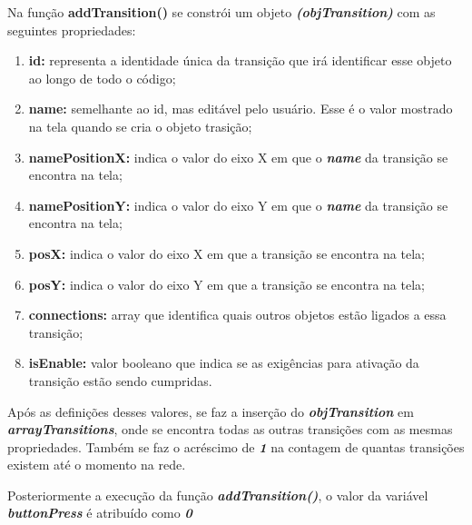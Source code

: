 \documentclass[
	12pt,				%
	openright,			%
	oneside,			%
	a4paper,			%
	english,			%
	brazil				%
	]{abntex2}
\begin{document}


Na função \textbf{addTransition()} se constrói um objeto \textbf{\textit{(objTransition)}} com as seguintes propriedades:

\begin{enumerate}
	\item \textbf{id:} representa a identidade única da transição que irá identificar esse objeto ao longo de todo o código;
	\item \textbf{name:} semelhante ao id, mas editável pelo usuário. Esse é o valor mostrado na tela quando se cria o objeto trasição;
	\item \textbf{namePositionX:} indica o valor do eixo X em que o \textbf{\textit{name}} da transição se encontra na tela;
	\item \textbf{namePositionY:} indica o valor do eixo Y em que o \textbf{\textit{name}} da transição se encontra na tela;
	\item \textbf{posX:} indica o valor do eixo X em que a transição se encontra na tela;
	\item \textbf{posY:} indica o valor do eixo Y em que a transição se encontra na tela;
	\item \textbf{connections:} array que identifica quais outros objetos estão ligados a essa transição;
	\item \textbf{isEnable:} valor booleano que indica se as exigências para ativação da transição estão sendo cumpridas.\label{prop:isEnable}
\end{enumerate}

Após as definições desses valores, se faz a inserção do \textbf{\textit{objTransition}} em \textbf{\textit{arrayTransitions}}, onde se encontra todas as outras transições com as mesmas propriedades. Também se faz o acréscimo de \textbf{\textit{1}} na contagem de quantas transições existem até o momento na rede.



Posteriormente a execução da função \textbf{\textit{addTransition()}}, o valor da variável \textbf{\textit{buttonPress}} é atribuído como \textbf{\textit{0}}
\end{document}
